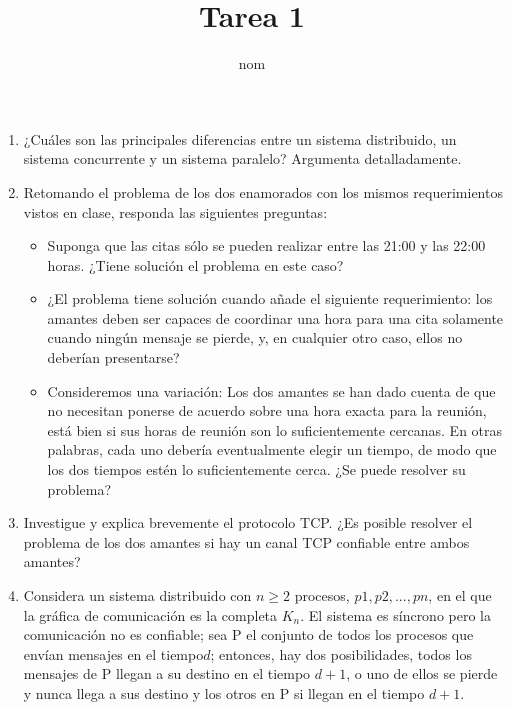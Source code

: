 \documentclass[]{article}
\title{Tarea 1}
\author{nom}
\begin{document}
\maketitle
\begin{enumerate}
    \item ¿Cuáles son las principales diferencias entre un sistema distribuido, un sistema
concurrente y un sistema paralelo? Argumenta detalladamente.
    \item Retomando el problema de los dos enamorados con los mismos requerimientos
vistos en clase, responda las siguientes preguntas:

\begin{itemize}
	\item Suponga que las citas sólo se pueden realizar entre las 21:00 y las 22:00 horas. ¿Tiene solución el problema en este caso?
	\item ¿El problema tiene solución cuando añade el siguiente requerimiento: los amantes deben ser capaces de coordinar una hora para una cita solamente cuando ningún mensaje se pierde, y, en cualquier otro caso, ellos no deberían presentarse?

	\item Consideremos una variación: Los dos amantes se han dado cuenta de que no necesitan ponerse de acuerdo sobre una hora exacta para la reunión, está bien si sus horas de reunión son lo suficientemente cercanas. En otras palabras, cada uno debería eventualmente elegir un tiempo, de modo que los dos tiempos estén lo suficientemente cerca. ¿Se puede resolver su problema?

\end{itemize}

    \item Investigue y explica brevemente el protocolo TCP. ¿Es posible resolver el problema
de los dos amantes si hay un canal TCP confiable entre ambos amantes?


    \item Considera un sistema distribuido con $n \geq 2$ procesos, $p1, p2, . . . , pn$, en el que la gráfica de comunicación es la completa $K_n$. El sistema es síncrono pero la comunicación no es confiable; sea P el conjunto de todos los procesos que envían mensajes en el tiempo$d$; entonces, hay dos posibilidades, todos los mensajes de P llegan a su destino en el tiempo $d + 1$, o uno de ellos se pierde y nunca llega a sus destino y los otros en P si llegan en el tiempo $d + 1$.


\end{enumerate}
\end{document}
